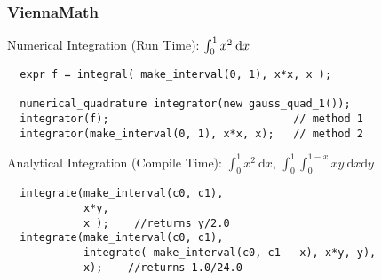 

\begin{frame}[fragile]
\frametitle{ViennaMath}

 \begin{block}{Numerical Integration (Run Time): $\color{black} \int_0^1 x^2 \: \mathrm{d} x$}
\begin{lstlisting}
  expr f = integral( make_interval(0, 1), x*x, x );

  numerical_quadrature integrator(new gauss_quad_1());
  integrator(f);                             // method 1
  integrator(make_interval(0, 1), x*x, x);   // method 2
\end{lstlisting} 
 \end{block}
 
 \begin{block}{Analytical Integration (Compile Time): {\color{black} $\int_0^1 x^2 \: \mathrm{d} x$, $\int_0^1 \int_0^{1-x} xy \: \mathrm{d}x \mathrm{d}y$} }
\begin{lstlisting}
  integrate(make_interval(c0, c1),
            x*y,
            x );    //returns y/2.0
  integrate(make_interval(c0, c1),
            integrate( make_interval(c0, c1 - x), x*y, y),
            x);    //returns 1.0/24.0
\end{lstlisting} 
 \end{block}
 
\end{frame}



